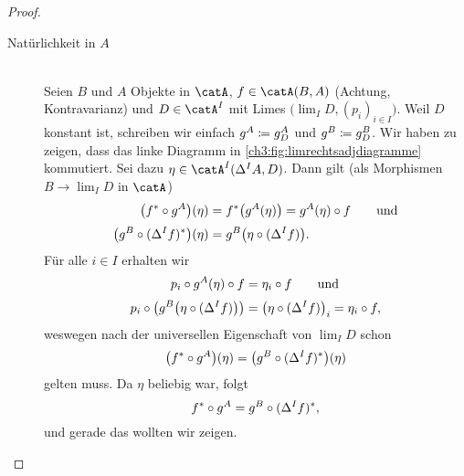 \begin{proof}
    \begin{description}
        \item[Natürlichkeit in \boldmath$A$]\hfill\\
            Seien $B$ und $A$ Objekte in $\catA$, $f\in\catA(B,A)$ (Achtung,
            Kontravarianz) und $D\in\catA^I$ mit Limes $\bigl(\lim_I
            D,(p_i)_{i\in I}\bigr)$. Weil $D$ konstant ist, schreiben wir
            einfach $g^A \coloneqq g_D^A$ und $g^B \coloneqq g_D^B$.
            Wir haben zu zeigen, dass das linke Diagramm in
            \cref{ch3:fig:limrechtsadjdiagramme} kommutiert.  Sei dazu
            $\eta\in\catA^I(\Delta^I A, D)$. Dann gilt (als Morphismen
            $B\to\lim_I D$ in $\catA$)
            \begin{align*}
                \bigl(f^* \after g^A\bigr)(\eta)
                &= f^*\bigl( g^A(\eta) \bigr)
                 = g^A(\eta) \circ f
                \qquad\text{und}\\[0.5ex]
                \bigl(g^B \circ (\Delta^I f)^*\bigr)(\eta)
                &= g^B\bigl( \eta \after (\Delta^I f) \bigr)
            . \end{align*}
            Für alle $i\in I$ erhalten wir
            \begin{align*}
                p_i\after g^A(\eta)\after f 
                &= \eta_i\after f
                \qquad\text{und}\\[0.5ex]
                p_i\after \bigl(g^B\bigl( \eta \after (\Delta^I f) \bigr)\bigr)
                &= \bigl( \eta \after (\Delta^I f)\bigr)_i
                 = \eta_i \after f
            , \end{align*}
            weswegen nach der universellen Eigenschaft von $\lim_I D$
            schon 
            \[ \bigl(f^* \after g^A\bigr)(\eta) 
                = \bigl(g^B \circ (\Delta^I f)^*\bigr)(\eta)
            \]
            gelten muss. Da $\eta$ beliebig war, folgt
            \[ f^* \after g^A = g^B \circ (\Delta^I f)^* , \]
            und gerade das wollten wir zeigen.
            

\end{description}
\end{proof}

